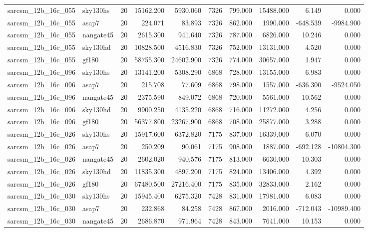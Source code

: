 \begin{tabular}{llrrrrrrrr}
sarcsm\_12b\_16c\_055 & sky130hs & 20 & 15162.200 & 5930.060 & 7326 & 799.000 & 15488.000 & 6.149 & 0.000 \\
sarcsm\_12b\_16c\_055 & asap7 & 20 & 224.071 & 83.893 & 7326 & 862.000 & 1990.000 & -648.539 & -9984.900 \\
sarcsm\_12b\_16c\_055 & nangate45 & 20 & 2615.300 & 941.640 & 7326 & 787.000 & 6826.000 & 10.246 & 0.000 \\
sarcsm\_12b\_16c\_055 & sky130hd & 20 & 10828.500 & 4516.830 & 7326 & 752.000 & 13131.000 & 4.520 & 0.000 \\
sarcsm\_12b\_16c\_055 & gf180 & 20 & 58755.300 & 24602.900 & 7326 & 774.000 & 30657.000 & 1.947 & 0.000 \\
sarcsm\_12b\_16c\_096 & sky130hs & 20 & 13141.200 & 5308.290 & 6868 & 728.000 & 13155.000 & 6.983 & 0.000 \\
sarcsm\_12b\_16c\_096 & asap7 & 20 & 215.708 & 77.609 & 6868 & 798.000 & 1557.000 & -636.300 & -9524.050 \\
sarcsm\_12b\_16c\_096 & nangate45 & 20 & 2375.590 & 849.072 & 6868 & 720.000 & 5561.000 & 10.562 & 0.000 \\
sarcsm\_12b\_16c\_096 & sky130hd & 20 & 9900.250 & 4135.220 & 6868 & 716.000 & 11272.000 & 4.256 & 0.000 \\
sarcsm\_12b\_16c\_096 & gf180 & 20 & 56377.800 & 23267.900 & 6868 & 708.000 & 25877.000 & 3.288 & 0.000 \\
sarcsm\_12b\_16c\_026 & sky130hs & 20 & 15917.600 & 6372.820 & 7175 & 837.000 & 16339.000 & 6.070 & 0.000 \\
sarcsm\_12b\_16c\_026 & asap7 & 20 & 250.209 & 90.061 & 7175 & 908.000 & 1887.000 & -692.128 & -10804.300 \\
sarcsm\_12b\_16c\_026 & nangate45 & 20 & 2602.020 & 940.576 & 7175 & 813.000 & 6630.000 & 10.303 & 0.000 \\
sarcsm\_12b\_16c\_026 & sky130hd & 20 & 11835.300 & 4897.200 & 7175 & 824.000 & 13406.000 & 4.392 & 0.000 \\
sarcsm\_12b\_16c\_026 & gf180 & 20 & 67480.500 & 27216.400 & 7175 & 835.000 & 32833.000 & 2.162 & 0.000 \\
sarcsm\_12b\_16c\_030 & sky130hs & 20 & 15945.400 & 6275.320 & 7428 & 831.000 & 17981.000 & 6.083 & 0.000 \\
sarcsm\_12b\_16c\_030 & asap7 & 20 & 232.868 & 84.258 & 7428 & 867.000 & 2016.000 & -712.043 & -10989.400 \\
sarcsm\_12b\_16c\_030 & nangate45 & 20 & 2686.870 & 971.964 & 7428 & 843.000 & 7641.000 & 10.153 & 0.000 \\

\end{tabular}
